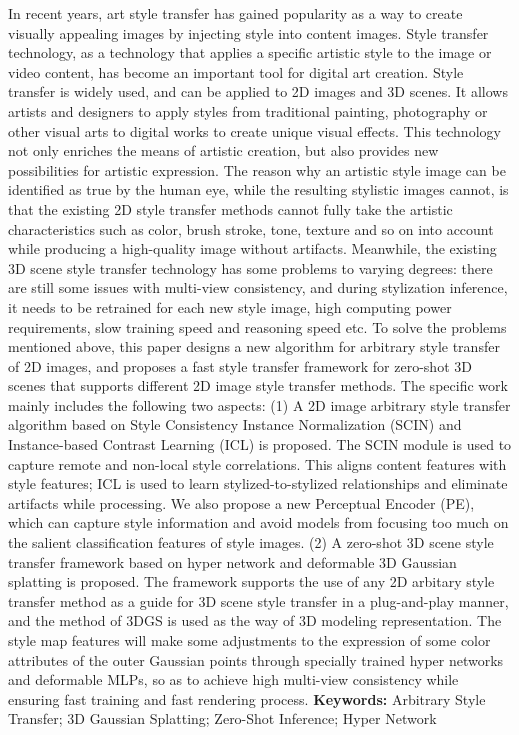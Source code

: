 \cleardoublepage
{}
In recent years, art style transfer has gained popularity as a way to create visually appealing images by injecting style into content images. Style transfer technology, as a technology that applies a specific artistic style to the image or video content, has become an important tool for digital art creation. Style transfer is widely used, and can be applied to 2D images and 3D scenes. It allows artists and designers to apply styles from traditional painting, photography or other visual arts to digital works to create unique visual effects. This technology not only enriches the means of artistic creation, but also provides new possibilities for artistic expression. The reason why an artistic style image can be identified as true by the human eye, while the resulting stylistic images cannot, is that the existing 2D style transfer methods cannot fully take the artistic characteristics such as color, brush stroke, tone, texture and so on into account while producing a high-quality image without artifacts. Meanwhile, the existing 3D scene style transfer technology has some problems to varying degrees: there are still some issues with multi-view consistency, and during stylization inference, it needs to be retrained for each new style image, high computing power requirements, slow training speed and reasoning speed etc. To solve the problems mentioned above, this paper designs a new algorithm for arbitrary style transfer of 2D images, and proposes a fast style transfer framework for zero-shot 3D scenes that supports different 2D image style transfer methods. The specific work mainly includes the following two aspects:
\newline \indent(1) A 2D image arbitrary style transfer algorithm based on Style Consistency Instance Normalization (SCIN) and Instance-based Contrast Learning (ICL) is proposed. The SCIN module is used to capture remote and non-local style correlations. This aligns content features with style features; ICL is used to learn stylized-to-stylized relationships and eliminate artifacts while processing. We also propose a new Perceptual Encoder (PE), which can capture style information and avoid models from focusing too much on the salient classification features of style images.
\newline \indent(2) A zero-shot 3D scene style transfer framework based on hyper network and deformable 3D Gaussian splatting is proposed. The framework supports the use of any 2D arbitary style transfer method as a guide for 3D scene style transfer in a plug-and-play manner, and the method of 3DGS is used as the way of 3D modeling representation. The style map features will make some adjustments to the expression of some color attributes of the outer Gaussian points through specially trained hyper networks and deformable MLPs, so as to achieve high multi-view consistency while ensuring fast training and fast rendering process.
\newline
{\textbf{Keywords:}} 
Arbitrary Style Transfer; 3D Gaussian Splatting; Zero-Shot Inference; Hyper Network 

